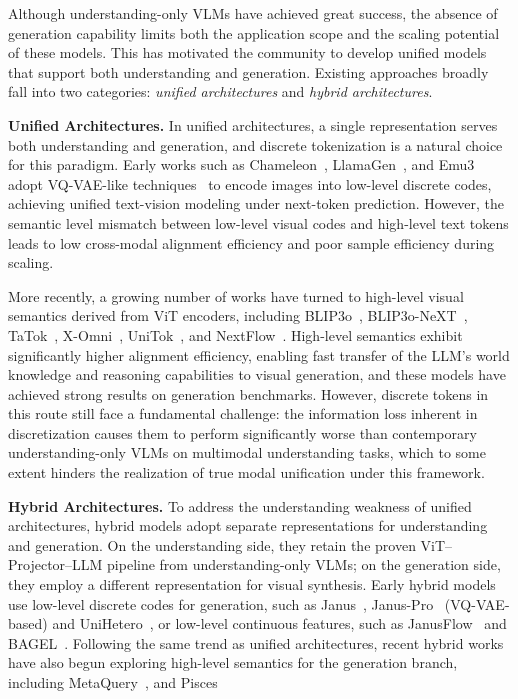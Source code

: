 \documentclass[11pt, a4paper, logo, copyright]{googledeepmind}
\begin{document}
Although understanding-only VLMs have achieved great success, the absence of generation capability limits both the application scope and the scaling potential of these models. This has motivated the community to develop unified models that support both understanding and generation. Existing approaches broadly fall into two categories: \emph{unified architectures} and \emph{hybrid architectures}.

\textbf{Unified Architectures.}
In unified architectures, a single representation serves both understanding and generation, and discrete tokenization is a natural choice for this paradigm. Early works such as Chameleon~\citep{team2024chameleon}, LlamaGen~\citep{sun2024autoregressive}, and Emu3~\citep{wang2024emu3} adopt VQ-VAE-like techniques~\citep{van2017neural} to encode images into low-level discrete codes, achieving unified text-vision modeling under next-token prediction. However, the semantic level mismatch between low-level visual codes and high-level text tokens leads to low cross-modal alignment efficiency and poor sample efficiency during scaling.

More recently, a growing number of works have turned to high-level visual semantics derived from ViT encoders, including BLIP3o~\citep{chen2025blip3ofamilyfullyopen}, BLIP3o-NeXT~\citep{chen2025blip3o}, TaTok~\citep{han2025vision}, X-Omni~\citep{geng2025xomnireinforcementlearningmakes}, UniTok~\citep{ma2025unitok}, and NextFlow~\citep{zhang2026nextflow}. High-level semantics exhibit significantly higher alignment efficiency, enabling fast transfer of the LLM's world knowledge and reasoning capabilities to visual generation, and these models have achieved strong results on generation benchmarks. However, discrete tokens in this route still face a fundamental challenge: the information loss inherent in discretization causes them to perform significantly worse than contemporary understanding-only VLMs on multimodal understanding tasks, which to some extent hinders the realization of true modal unification under this framework.

\textbf{Hybrid Architectures.}
To address the understanding weakness of unified architectures, hybrid models adopt separate representations for understanding and generation. On the understanding side, they retain the proven ViT--Projector--LLM pipeline from understanding-only VLMs; on the generation side, they employ a different representation for visual synthesis. Early hybrid models use low-level discrete codes for generation, such as Janus~\citep{wu2025janus}, Janus-Pro~\citep{janusPro} (VQ-VAE-based) and UniHetero~\citep{chen2025unihetero}, or low-level continuous features, such as JanusFlow~\citep{ma2025janusflow} and BAGEL~\citep{deng2025emerging}. Following the same trend as unified architectures, recent hybrid works have also begun exploring high-level semantics for the generation branch, including MetaQuery~\citep{pan2025transfer}, and Pisces~\citep{xu2025pisces}
\end{document}
